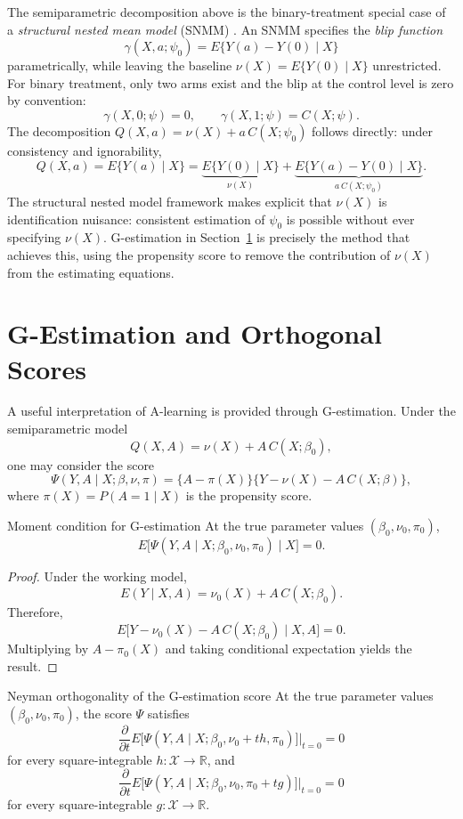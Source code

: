 \documentclass[master.tex]{subfiles}
\begin{document}
The semiparametric decomposition above is the binary-treatment special case of
a \emph{structural nested mean model} (SNMM) \citep{robins2004optimal}. An
SNMM specifies the \emph{blip function}
\[
\gamma(X,a;\psi_0)=E\{Y(a)-Y(0)\mid X\}
\]
parametrically, while leaving the baseline \(\nu(X)=E\{Y(0)\mid X\}\)
unrestricted. For binary treatment, only two arms exist and the blip at the
control level is zero by convention:
\[
\gamma(X,0;\psi)=0,\qquad \gamma(X,1;\psi)=C(X;\psi).
\]
The decomposition \(Q(X,a)=\nu(X)+a\,C(X;\psi_0)\) follows directly: under
consistency and ignorability,
\[
Q(X,a)
=E\{Y(a)\mid X\}
=\underbrace{E\{Y(0)\mid X\}}_{\nu(X)}
 +\underbrace{E\{Y(a)-Y(0)\mid X\}}_{a\,C(X;\psi_0)}.
\]
The structural nested model framework makes explicit that \(\nu(X)\) is
identification nuisance: consistent estimation of \(\psi_0\) is possible
without ever specifying \(\nu(X)\). G-estimation in
Section~\ref{w14:sec:gest} is precisely the method that achieves this,
using the propensity score to remove the contribution of \(\nu(X)\) from
the estimating equations.

\section{G-Estimation and Orthogonal Scores}
\label{w14:sec:gest}

A useful interpretation of A-learning is provided through G-estimation. Under the semiparametric model
\[
Q(X,A)=\nu(X)+A\,C(X;\beta_0),
\]
one may consider the score
\[
\Psi(Y,A\mid X;\beta,\nu,\pi)=\{A-\pi(X)\}\{Y-\nu(X)-A\,C(X;\beta)\},
\]
where \(\pi(X)=P(A=1\mid X)\) is the propensity score.

\begin{prop}{Moment condition for G-estimation}
\label{w14:prop:gest}
At the true parameter values \((\beta_0,\nu_0,\pi_0)\),
\[
E\big[\Psi(Y,A\mid X;\beta_0,\nu_0,\pi_0)\mid X\big]=0.
\]
\end{prop}

\begin{proof}
Under the working model,
\[
E(Y\mid X,A)=\nu_0(X)+A\,C(X;\beta_0).
\]
Therefore,
\[
E\big[Y-\nu_0(X)-A\,C(X;\beta_0)\mid X,A\big]=0.
\]
Multiplying by \(A-\pi_0(X)\) and taking conditional expectation yields the result.
\end{proof}

\begin{prop}{Neyman orthogonality of the G-estimation score}
\label{w14:prop:neyman-orth}
At the true parameter values \((\beta_0,\nu_0,\pi_0)\), the score \(\Psi\) satisfies
\[
\frac{\partial}{\partial t}
E\bigl[\Psi(Y,A\mid X;\beta_0,\nu_0+th,\pi_0)\bigr]\big|_{t=0}=0
\]
for every square-integrable \(h:\mathcal X\to\mathbb R\), and
\[
\frac{\partial}{\partial t}
E\bigl[\Psi(Y,A\mid X;\beta_0,\nu_0,\pi_0+tg)\bigr]\big|_{t=0}=0
\]
for every square-integrable \(g:\mathcal X\to\mathbb R\).
\end{prop}
\end{document}
